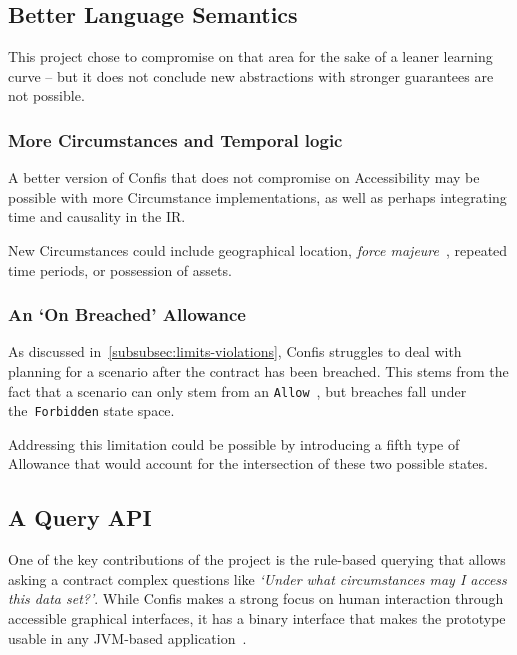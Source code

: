 \subsection{Better Language Semantics}\label{subsec:future:better-language-semantics}

This project chose to compromise on that area for the sake of a leaner learning curve -- but it does not conclude new abstractions with stronger guarantees are not possible.

\subsubsection{More Circumstances and Temporal logic}\label{subsubsec:future:more-circumstances-and-temporal-logic}
A better version of Confis that does not compromise on Accessibility may be possible with more Circumstance implementations, as well as perhaps integrating time and causality in the IR\@.

New Circumstances could include geographical location, \emph{force majeure}~\cite{forceMajeureDefinition}, repeated time periods, or possession of assets.

\subsubsection{An `On Breached' Allowance}

As discussed in~\autoref{subsubsec:limits-violations}, Confis struggles to deal with planning for a scenario after the contract has been breached.
This stems from the fact that a scenario can only stem from an \texttt{Allow}~, but breaches fall under the~\texttt{Forbidden} state space.

Addressing this limitation could be possible by introducing a fifth type of Allowance that would account for the intersection of these two possible states.

\subsection{A Query API}\label{subsec:future:query-api}
One of the key contributions of the project is the rule-based querying that allows asking a contract complex questions like \emph{`Under what circumstances may I access this data set?'}.
While Confis makes a strong focus on human interaction through accessible graphical interfaces, it has a binary interface that makes the prototype usable in any JVM-based application~\cite{venners1998java}.


